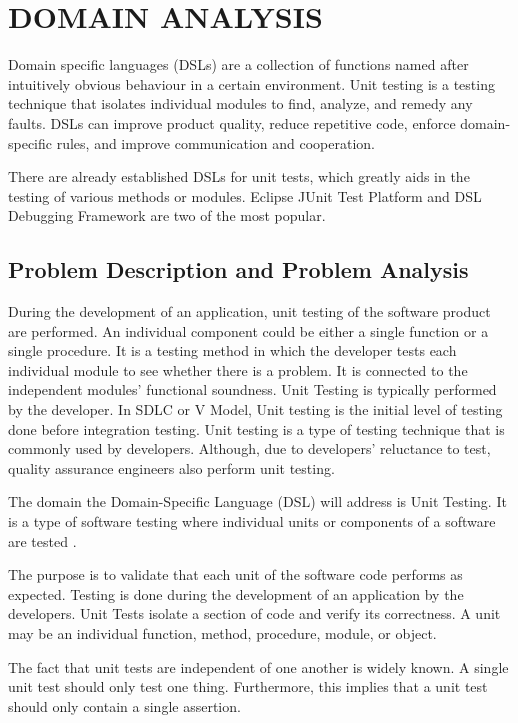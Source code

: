 \chapter{DOMAIN ANALYSIS}

Domain specific languages (DSLs) are a collection of functions named after intuitively obvious behaviour in a certain environment. Unit testing is a testing technique that isolates individual modules to find, analyze, and remedy any faults. DSLs can improve product quality, reduce repetitive code, enforce domain-specific rules, and improve communication and cooperation.

There are already established DSLs for unit tests, which greatly aids in the testing of various methods or modules. Eclipse JUnit Test Platform and DSL Debugging Framework are two of the most popular. 



\section{Problem Description and Problem Analysis}

During the development of an application, unit testing of the software product are performed. An individual component could be either a single function or a single procedure. It is a testing method in which the developer tests each individual module to see whether there is a problem. It is connected to the independent modules' functional soundness. Unit Testing is typically performed by the developer. In SDLC or V Model, Unit testing is the initial level of testing done before integration testing. Unit testing is a type of testing technique that is commonly used by developers. Although, due to developers' reluctance to test, quality assurance engineers also perform unit testing. 

The domain the Domain-Specific Language (DSL) will address is Unit Testing. It  is a type of software testing where individual units or components of a software are tested \cite{techtarget}.

 The purpose is to validate that each unit of the software code performs as expected. Testing is done during the development of an application by the developers. Unit Tests isolate a section of code and verify its correctness. A unit may be an individual function, method, procedure, module, or object.

 The fact that unit tests are independent of one another is widely known. A single unit test should only test one thing. Furthermore, this implies that a unit test should only contain a single assertion.

